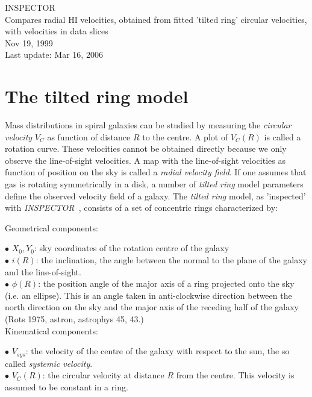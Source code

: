 \documentclass[11pt,a4paper]{article}
\begin{document}
\begin{center}
{\Large INSPECTOR}\\[1.5cm]
{\large Compares radial HI velocities, obtained from fitted 'tilted ring' 
circular velocities, with velocities in data slices}\\[1.5cm]
Nov 19,  1999\\
Last update: Mar 16, 2006
\end{center}


\section{The tilted ring model}
Mass distributions in spiral galaxies can be studied by measuring the
{\it circular velocity} $V_C$ as function of distance $R$ to the centre. 
A plot of $V_{C}(R)$ is called a rotation curve. These velocities cannot be
obtained directly because we only observe the line-of-sight velocities. 
A map with the line-of-sight velocities as function of position
on the sky is called a {\it radial velocity field}. If one assumes
that gas is rotating symmetrically in a disk, a number of {\it tilted ring}
model parameters define the observed velocity field of a galaxy. The 
{\it tilted ring} model, as 'inspected' with {\it INSPECTOR\ }, consists of a 
set of concentric rings characterized by:

Geometrical components:

$\bullet$ $X_0,Y_0$: sky coordinates of the rotation centre of the galaxy\\
$\bullet$ $i(R)$: the inclination, the angle between the normal to the plane of 
          the galaxy and the line-of-sight.\\
$\bullet$ $\phi(R)$: the position angle of the major axis of a ring projected
          onto the sky (i.e. an ellipse). This is an angle taken in 
          anti-clockwise direction
          between the north direction on the sky and the major axis
          of the receding half of the galaxy (Rots 1975, astron, astrophys 45, 43.)\\

Kinematical components:

$\bullet$ $V_{sys}$: the velocity of the centre of the galaxy with respect
          to the sun, the so called {\it systemic velocity}.\\
$\bullet$ $V_{C}(R)$: the circular velocity at distance $R$ from the 
          centre. This velocity is assumed to be constant in a ring.\\
\end{document}
